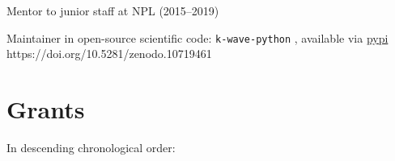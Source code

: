 \documentclass[11pt, a4paper]{awesome-cv}
\begin{document}
\begin{cventries}
{\begin{cvitems}
\item Mentor to junior staff at NPL (2015--2019)
\item Maintainer in open-source scientific code: \texttt{k-wave-python} \href{https://github.com/waltsims/k-wave-python}{}, available via \href{https://pypi.org/project/k-Wave-python/}{pypi} \newline{}%
https://doi.org/10.5281/zenodo.10719461
\end{cvitems}}

%
%
\end{cventries}

\newpage
\hypertarget{grants}{\section{Grants}\label{grants}}

In descending chronological order:
\end{document}
